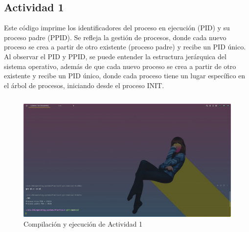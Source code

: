 \documentclass{article}
\newenvironment{code}{\captionsetup{type=listing}}{}
\begin{document}
\subsection{Actividad 1}
Este código imprime los identificadores del proceso en ejecución (PID) y
su proceso padre (PPID). Se refleja la gestión de procesos, donde cada 
nuevo proceso se crea a partir de otro existente (proceso padre) y 
recibe un PID único. Al observar el PID y PPID, se puede entender la 
estructura jerárquica del sistema operativo, además de que cada nuevo 
proceso se crea a partir de otro existente y recibe un PID único, donde
cada proceso tiene un lugar específico en el árbol de procesos,
iniciando desde el proceso INIT.
\begin{code}
	\inputminted{c}{../Actividades/e1.c}
\end{code}
\begin{figure}[h]
	\caption{Compilación y ejecución de Actividad 1}
	\centering
	\includegraphics[scale=0.3,trim={0 0 20cm 25cm},clip]{act-e1.png}
\end{figure}
\end{document}
